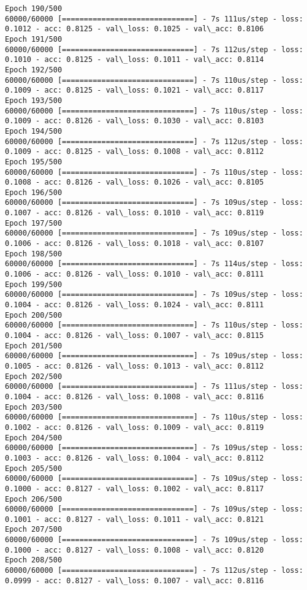 \documentclass[11pt]{article}
\begin{document}
\begin{Verbatim}[commandchars=\\\{\}]
Epoch 190/500
60000/60000 [==============================] - 7s 111us/step - loss: 0.1012 - acc: 0.8125 - val\_loss: 0.1025 - val\_acc: 0.8106
Epoch 191/500
60000/60000 [==============================] - 7s 112us/step - loss: 0.1010 - acc: 0.8125 - val\_loss: 0.1011 - val\_acc: 0.8114
Epoch 192/500
60000/60000 [==============================] - 7s 110us/step - loss: 0.1009 - acc: 0.8125 - val\_loss: 0.1021 - val\_acc: 0.8117
Epoch 193/500
60000/60000 [==============================] - 7s 110us/step - loss: 0.1009 - acc: 0.8126 - val\_loss: 0.1030 - val\_acc: 0.8103
Epoch 194/500
60000/60000 [==============================] - 7s 112us/step - loss: 0.1009 - acc: 0.8125 - val\_loss: 0.1008 - val\_acc: 0.8112
Epoch 195/500
60000/60000 [==============================] - 7s 110us/step - loss: 0.1008 - acc: 0.8126 - val\_loss: 0.1026 - val\_acc: 0.8105
Epoch 196/500
60000/60000 [==============================] - 7s 109us/step - loss: 0.1007 - acc: 0.8126 - val\_loss: 0.1010 - val\_acc: 0.8119
Epoch 197/500
60000/60000 [==============================] - 7s 109us/step - loss: 0.1006 - acc: 0.8126 - val\_loss: 0.1018 - val\_acc: 0.8107
Epoch 198/500
60000/60000 [==============================] - 7s 114us/step - loss: 0.1006 - acc: 0.8126 - val\_loss: 0.1010 - val\_acc: 0.8111
Epoch 199/500
60000/60000 [==============================] - 7s 109us/step - loss: 0.1004 - acc: 0.8126 - val\_loss: 0.1024 - val\_acc: 0.8111
Epoch 200/500
60000/60000 [==============================] - 7s 110us/step - loss: 0.1004 - acc: 0.8126 - val\_loss: 0.1007 - val\_acc: 0.8115
Epoch 201/500
60000/60000 [==============================] - 7s 109us/step - loss: 0.1005 - acc: 0.8126 - val\_loss: 0.1013 - val\_acc: 0.8112
Epoch 202/500
60000/60000 [==============================] - 7s 111us/step - loss: 0.1004 - acc: 0.8126 - val\_loss: 0.1008 - val\_acc: 0.8116
Epoch 203/500
60000/60000 [==============================] - 7s 110us/step - loss: 0.1002 - acc: 0.8126 - val\_loss: 0.1009 - val\_acc: 0.8119
Epoch 204/500
60000/60000 [==============================] - 7s 109us/step - loss: 0.1003 - acc: 0.8126 - val\_loss: 0.1004 - val\_acc: 0.8112
Epoch 205/500
60000/60000 [==============================] - 7s 109us/step - loss: 0.1000 - acc: 0.8127 - val\_loss: 0.1002 - val\_acc: 0.8117
Epoch 206/500
60000/60000 [==============================] - 7s 109us/step - loss: 0.1001 - acc: 0.8127 - val\_loss: 0.1011 - val\_acc: 0.8121
Epoch 207/500
60000/60000 [==============================] - 7s 109us/step - loss: 0.1000 - acc: 0.8127 - val\_loss: 0.1008 - val\_acc: 0.8120
Epoch 208/500
60000/60000 [==============================] - 7s 112us/step - loss: 0.0999 - acc: 0.8127 - val\_loss: 0.1007 - val\_acc: 0.8116

\end{Verbatim}
\end{document}
